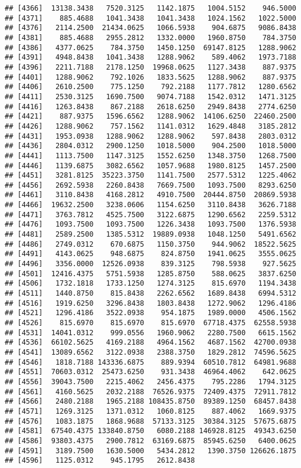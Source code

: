 \documentclass[]{article}
\begin{document}
\begin{verbatim}
## [4366]  13138.3438   7520.3125   1142.1875   1004.5152    946.5000
## [4371]    885.4688   1041.3438   1041.3438   1024.1562   1022.5000
## [4376]   2114.2500  21434.0625   1066.5938    904.6875   9086.8438
## [4381]    885.4688   2955.2812   1332.0000   1960.8750    784.3750
## [4386]   4377.0625    784.3750   1450.1250  69147.8125   1288.9062
## [4391]   4948.8438   1041.3438   1288.9062    589.4062   1973.7188
## [4396]   2211.7188   2178.1250  19968.0625   1127.3438    887.9375
## [4401]   1288.9062    792.1026   1833.5625   1288.9062    887.9375
## [4406]   2610.2500    775.1250    792.2188   1177.7812   1280.6562
## [4411]   2530.3125   1690.7500   9074.7188   1542.0312   1471.3125
## [4416]   1263.8438    867.2188   2618.6250   2949.8438   2774.6250
## [4421]    887.9375   1596.6562   1288.9062  14106.6250  22460.2500
## [4426]   1288.9062    757.1562   1141.0312   1629.4848   3185.2812
## [4431]   1953.0938   1288.9062   1288.9062    597.8438   2803.0312
## [4436]   2804.0312   2900.1250   1018.5000    904.2500   1018.5000
## [4441]   1113.7500   1147.3125   1552.6250   1348.3750   1268.7500
## [4446]   1139.6875   3082.6562   1057.9688   1980.8125   1457.2500
## [4451]   3281.8125  35223.3750   1141.7500   2577.5312   1225.4062
## [4456]   2692.5938   2260.8438   7669.7500   1093.7500   8293.6250
## [4461]   3110.8438   4168.2812   4910.7500  20444.8750  20869.5938
## [4466]  19632.2500   3238.0606   1154.6250   3110.8438   3626.7188
## [4471]   3763.7812   4525.7500   3122.6875   1290.6562   2259.5312
## [4476]   1093.7500   1093.7500   1226.3438   1093.7500   1376.5938
## [4481]   2589.2500   1385.5312  19889.0938   1048.1250   5491.6562
## [4486]   2749.0312    670.6875   1150.3750    944.9062  18522.5625
## [4491]   4143.0625    948.6875    824.8750   1941.0625   3555.0625
## [4496]   3356.0000  12526.0938    839.3125    798.5938    927.5625
## [4501]  12416.4375   5751.5938   1285.8750    588.0625   3837.6250
## [4506]   1732.1818   1733.1250   1274.3125    815.6970   1194.3438
## [4511]   1440.8750    815.8438   2262.6562   1689.8438   6994.5312
## [4516]   1919.6250   3296.8438   1803.8438   1272.9062   1296.4186
## [4521]   1296.4186   3522.0938    954.1875   1989.0000   4506.1562
## [4526]    815.6970    815.6970    815.6970  67718.4375  62558.5938
## [4531]  14041.0312    999.0556   1960.9062   2280.7500   6615.1562
## [4536]  66102.5625   4169.2188   4964.1562   4687.1562  42700.0938
## [4541]  13089.6562   3122.0938   2388.3750   1829.2812  74596.5625
## [4546]   1818.7188 143336.6875    889.9394  60510.7812  64981.9688
## [4551]  70603.0312  25473.6250    931.3438  46964.4062    642.0625
## [4556]  39043.7500   2215.4062   2456.4375    795.2286   1794.3125
## [4561]   4160.5625   2032.2188  76526.9375  72409.4375  72911.7812
## [4566]   2480.2188   1965.2188 108435.8750  89389.1250  68457.8438
## [4571]   1269.3125   1371.0312   1060.8125    887.4062   1669.9375
## [4576]   1083.1875   1868.9688  57133.3125  30384.3125  57675.6875
## [4581]  67540.4375 133840.8750   6080.2188 146928.8125  49343.6250
## [4586]  93803.4375   2900.7812  63169.6875  85945.6250   6400.0625
## [4591]   3189.7500   1630.5000   5434.2812   1390.3750 126626.1875
## [4596]   1125.0312    945.1795   2612.8438
\end{verbatim}
\end{document}
